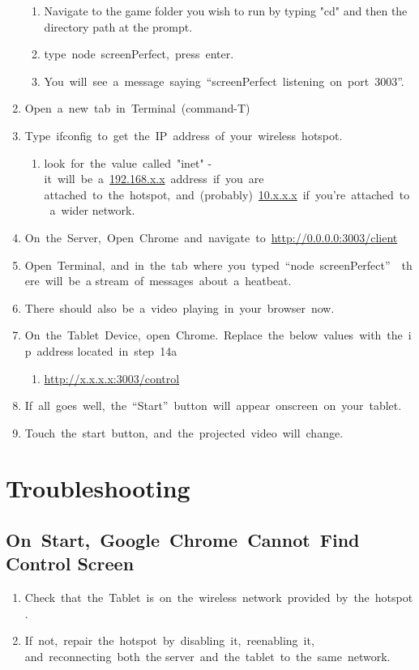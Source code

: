 \begin{enumerate}
	\begin{enumerate}
	\item{Navigate to the game folder you wish to run by typing "cd" and then the directory path at the prompt.}
	\item{type node screenPerfect, press enter.}
	\item{You will see a message saying “screenPerfect listening on port 3003”.}
	\end{enumerate}
\item{Open a new tab in Terminal (command-T)}
\item{Type ifconfig to get the IP address of your wireless hotspot.}
\begin{enumerate}
\item{look for the value called "inet" - it will be a \url{192.168.x.x} address if you are attached to the hotspot, and (probably) \url{10.x.x.x} if you’re attached to a wider network.}
\end{enumerate}
\item{On the Server, Open Chrome and navigate to \url{http://0.0.0.0:3003/client}}
\item{Open Terminal, and in the tab where you typed “node screenPerfect”  there will be a stream of messages about a heatbeat.}
\item{There should also be a video playing in your browser now.}
\item{On the Tablet Device, open Chrome. Replace the below values with the ip address located in step 14a}
\begin{enumerate}
\item{\url{http://x.x.x.x:3003/control}}
\end{enumerate}
\item{If all goes well, the “Start” button will appear onscreen on your tablet.}
\item{Touch the start button, and the projected video will change.}
\end{enumerate}

\section{Troubleshooting}

\subsection{On Start, Google Chrome Cannot Find Control Screen}

\begin{enumerate}
	\item{Check that the Tablet is on the wireless network provided by the hotspot.}
	\item{If not, repair the hotspot by disabling it, reenabling it, and reconnecting both the server and the tablet to the same network.}
\end{enumerate}

